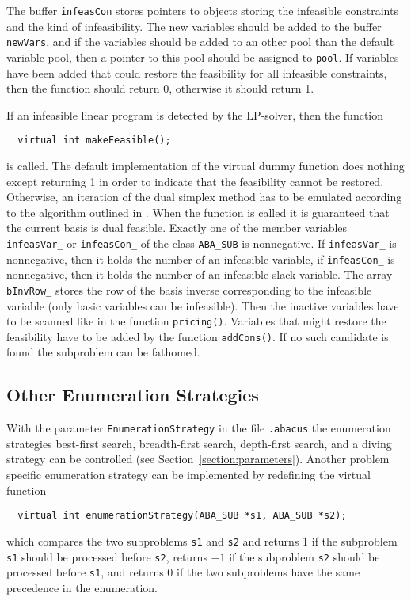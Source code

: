 The buffer {\tt infeasCon} stores pointers to objects storing the infeasible
constraints and the kind of infeasibility. The new variables should
be added to the buffer {\tt newVars}, and if the variables should be
added to an other pool than the default variable pool, then a pointer to this pool should
be assigned to {\tt *pool}. If variables have been added that could
restore the feasibility for all infeasible constraints, then the function
should return 0, otherwise it should return 1.

If an infeasible linear program is detected by the LP-solver, then
the function
\begin{verbatim}
  virtual int makeFeasible();
\end{verbatim}
\noindent
is called. The default implementation of the virtual dummy function
does nothing except returning 1 in order to indicate that the
feasibility cannot be restored. Otherwise, an iteration of the dual
simplex method has to be emulated according to the algorithm outlined
in \cite{Thi95}. 
When the function is called it is guaranteed that the current basis is 
dual feasible. Exactly one of the member variables {\tt infeasVar\_} or
{\tt infeasCon\_} of the class {\tt ABA\_SUB} is nonnegative. If {\tt infeasVar\_}
is nonnegative, then it holds the number of an infeasible variable, if
{\tt infeasCon\_} is nonnegative, then it holds the number of an infeasible
slack variable. The array {\tt bInvRow\_} stores the row of the basis inverse
corresponding to the infeasible variable (only basic variables can be
infeasible). Then the inactive variables have to be scanned like
in the function {\tt pricing()}. Variables that might restore the 
feasibility have to be added by the function {\tt addCons()}. If no such
candidate is found the subproblem can be fathomed.

\subsection{Other Enumeration Strategies}

With the parameter 
{\tt EnumerationStrategy}
in the file {\tt .abacus}
the enumeration strategies best-first search, breadth-first search,
depth-first search, and a diving strategy can be controlled 
(see Section~\ref{section:parameters}). 
Another problem specific enumeration strategy can be implemented by
redefining
the virtual function
\begin{verbatim}
  virtual int enumerationStrategy(ABA_SUB *s1, ABA_SUB *s2);
\end{verbatim}
which compares the two subproblems {\tt s1} and {\tt s2} and
returns 1 if the subproblem {\tt s1} should be processed before {\tt s2},
returns $-1$ if the subproblem {\tt s2} should be processed before {\tt s1},
and returns 0 if the two subproblems have the same precedence in the
enumeration.

